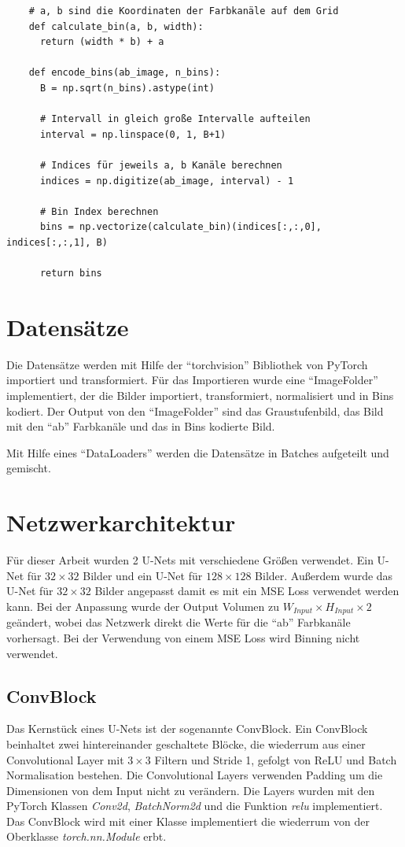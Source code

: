 \begin{listing}[H]
  \begin{verbatim}
    # a, b sind die Koordinaten der Farbkanäle auf dem Grid
    def calculate_bin(a, b, width):
      return (width * b) + a
  
    def encode_bins(ab_image, n_bins):
      B = np.sqrt(n_bins).astype(int)
  
      # Intervall in gleich große Intervalle aufteilen
      interval = np.linspace(0, 1, B+1)
  
      # Indices für jeweils a, b Kanäle berechnen
      indices = np.digitize(ab_image, interval) - 1
  
      # Bin Index berechnen
      bins = np.vectorize(calculate_bin)(indices[:,:,0], indices[:,:,1], B)
  
      return bins
  \end{verbatim}
\end{listing}

\section{Datensätze}
Die Datensätze werden mit Hilfe der ``torchvision'' Bibliothek von PyTorch importiert und transformiert. Für das Importieren wurde eine
``ImageFolder'' implementiert, der die Bilder importiert, transformiert, normalisiert und in Bins kodiert. Der Output von den ``ImageFolder''
sind das Graustufenbild, das Bild mit den ``ab'' Farbkanäle und das in Bins kodierte Bild.

Mit Hilfe eines ``DataLoaders'' werden die Datensätze in Batches aufgeteilt und gemischt.

\section{Netzwerkarchitektur}
Für dieser Arbeit wurden 2 U-Nets mit verschiedene Größen verwendet. Ein U-Net für $ 32 \times 32 $ Bilder und ein U-Net für $ 128 \times 128 $ 
Bilder. Außerdem wurde das U-Net für $ 32 \times 32 $ Bilder angepasst damit es mit ein MSE Loss verwendet werden kann. Bei der Anpassung wurde
der Output Volumen zu $ W_{Input} \times H_{Input} \times 2 $ geändert, wobei das Netzwerk direkt die Werte für die ``ab'' Farbkanäle vorhersagt.
Bei der Verwendung von einem MSE Loss wird Binning nicht verwendet.

\subsection{ConvBlock}
Das Kernstück eines U-Nets ist der sogenannte ConvBlock. Ein ConvBlock beinhaltet zwei hintereinander geschaltete Blöcke, die wiederrum
aus einer Convolutional Layer mit $3 \times 3$ Filtern und Stride 1, gefolgt von ReLU und Batch Normalisation bestehen. 
Die Convolutional Layers verwenden Padding um die Dimensionen von dem Input nicht zu verändern. Die Layers wurden mit den PyTorch 
Klassen \textit{Conv2d}, \textit{BatchNorm2d} und die Funktion \textit{relu} implementiert. Das ConvBlock wird mit einer Klasse implementiert
die wiederrum von der Oberklasse \textit{torch.nn.Module} erbt.

